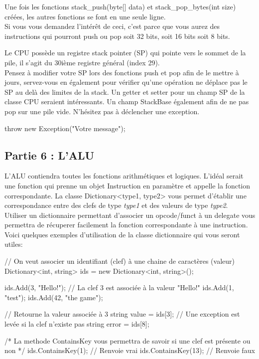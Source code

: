 Une fois les fonctions stack\_push(byte[] data) et stack\_pop\_bytes(int size)
créées, les autres fonctions se font en une seule ligne.\\ Si vous vous demandez
l'intérêt de ceci, c'est parce que vous aurez des instructions qui pourront push
ou pop soit 32 bits, soit 16 bits soit 8 bits.

Le CPU possède un registre stack pointer (SP) qui pointe vers le sommet de la
pile, il s'agit du 30ième registre général (index 29).\\ Pensez à modifier votre
SP lors des fonctions push et pop afin de le mettre à jours, servez-vous en
également pour vérifier qu'une opération ne déplace pas le SP au delà des
limites de la stack. Un getter et setter pour un champ SP de la classe CPU
seraient intéressants. Un champ StackBase également afin de ne pas pop sur une
pile vide. N'hésitez pas à déclencher une exception.
\begin{code}
  throw new Exception("Votre message");
\end{code}

\subsection{Partie 6 : L'ALU}

L'ALU contiendra toutes les fonctions arithmétiques et logiques. L'idéal serait
une fonction qui prenne un objet Instruction en paramètre et appelle la fonction
correspondante.  La classe Dictionary<type1, type2> vous permet d'établir une
correspondance entre des clefs de type \textit{type1} et des valeurs de type
\textit{type2}.\\ Utiliser un dictionnaire permettant d'associer un opcode/funct
à un delegate vous permettra de récuperer facilement la fonction correspondante
à une instruction.\\ Voici quelques exemples d'utilisation de la classe
dictionnaire qui vous seront utiles:
\begin{code}
  // On veut associer un identifiant (clef) à une chaine de caractères (valeur)
  Dictionary<int, string> ids = new Dictionary<int, string>();

  ids.Add(3, "Hello!"); // La clef 3 est associée à la valeur "Hello!"
  ids.Add(1, "test");
  ids.Add(42, "the game");

  // Retourne la valeur associée à 3
  string value = ids[3];
  // Une exception est levée si la clef n'existe pas
  string error = ids[8];

  /*
  La methode ContainsKey vous permettra de savoir si une clef est présente ou
  non
  */
  ids.ContainsKey(1); // Renvoie vrai
  ids.ContainsKey(13); // Renvoie faux
\end{code}

